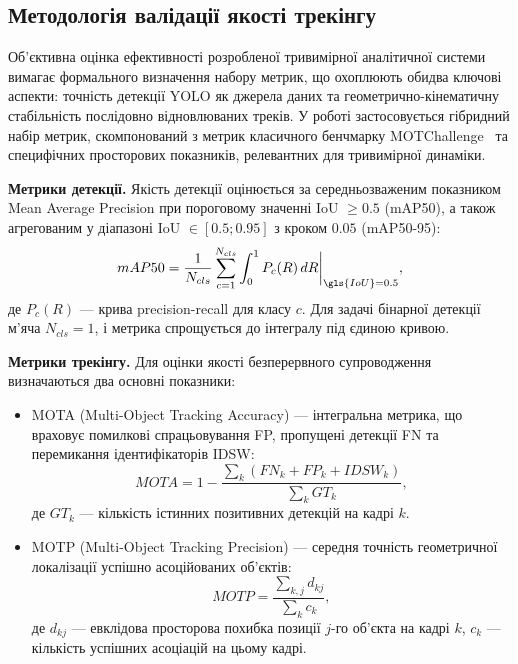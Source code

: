 \subsection{Методологія валідації якості трекінгу}

Об'єктивна оцінка ефективності розробленої тривимірної аналітичної системи вимагає
формального визначення набору метрик, що охоплюють обидва ключові аспекти:
точність детекції \gls{YOLO} як джерела даних та геометрично-кінематичну стабільність
послідовно відновлюваних треків. У роботі застосовується гібридний набір метрик,
скомпонований з метрик класичного бенчмарку MOTChallenge~\cite{bernardin_clearmot} та специфічних просторових
показників, релевантних для тривимірної динаміки.

\textbf{Метрики детекції.} Якість детекції оцінюється за середньозваженим показником
Mean Average Precision при пороговому значенні \gls{IoU} $\geq 0.5$ (mAP50), а також
агрегованим у діапазоні \gls{IoU} $\in [0.5; 0.95]$ з кроком $0.05$ (mAP50-95):
\begin{equation}mAP50 = \frac{1}{N_{cls}} \sum_{c=1}^{N_{cls}} \int_0^1 P_c(R) \,dR \bigg|_{\gls{IoU} = 0.5},\end{equation}
де $P_c(R)$ --- крива precision-recall для класу $c$. Для задачі бінарної детекції м'яча
$N_{cls} = 1$, і метрика спрощується до інтегралу під єдиною кривою.

\textbf{Метрики трекінгу.} Для оцінки якості безперервного супроводження визначаються
два основні показники:
\begin{itemize}
    \item \gls{MOTA} (Multi-Object Tracking Accuracy) ---
    інтегральна метрика, що враховує помилкові спрацьовування FP, пропущені детекції FN
    та перемикання ідентифікаторів IDSW:
    \begin{equation}MOTA = 1 - \frac{\sum_k (FN_k + FP_k + IDSW_k)}{\sum_k GT_k},\end{equation}
    де $GT_k$ --- кількість істинних позитивних детекцій на кадрі $k$.
    \item \gls{MOTP} (Multi-Object Tracking Precision) ---
    середня точність геометричної локалізації успішно асоційованих об'єктів:
    \begin{equation}MOTP = \frac{\sum_{k,j} d_{kj}}{\sum_k c_k},\end{equation}
    де $d_{kj}$ --- евклідова просторова похибка позиції $j$-го об'єкта на кадрі $k$,
    $c_k$ --- кількість успішних асоціацій на цьому кадрі.
\end{itemize}

